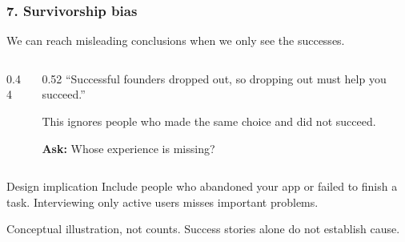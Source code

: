 \documentclass{beamer}
\begin{document}
\begin{frame}
    \frametitle{7. Survivorship bias}
    \small
    We can reach misleading conclusions when we only see the successes.
    \medskip
    \begin{columns}[c]
    \begin{column}{0.44\textwidth}
    \centering
    \end{column}
    \begin{column}{0.52\textwidth}
``Successful founders dropped out, so dropping out must help you succeed.''
\medskip

This ignores people who made the same choice and did not succeed.
\medskip

\textbf{Ask:} Whose experience is missing?
    \end{column}
    \end{columns}
    \begin{block}{Design implication}
Include people who abandoned your app or failed to finish a task. Interviewing only active users misses important problems.
    \end{block}
    {\tiny Conceptual illustration, not counts. Success stories alone do not establish cause.}
\end{frame}
\end{document}
